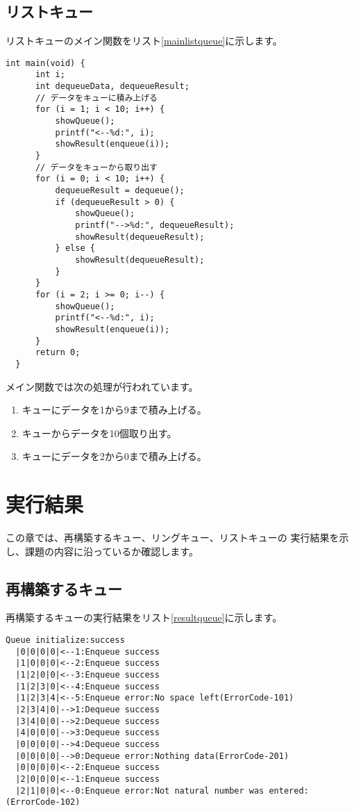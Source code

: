 \documentclass[a4j]{jarticle}
\begin{document}
\subsection{リストキュー}
リストキューのメイン関数をリスト\ref{mainlistqueue}に示します。

\begin{lstlisting}[caption=リストキューのメイン関数,label=mainlistqueue]
  int main(void) {
      int i;
      int dequeueData, dequeueResult;
      // データをキューに積み上げる
      for (i = 1; i < 10; i++) {
          showQueue();
          printf("<--%d:", i);
          showResult(enqueue(i));
      }
      // データをキューから取り出す
      for (i = 0; i < 10; i++) {
          dequeueResult = dequeue();
          if (dequeueResult > 0) {
              showQueue();
              printf("-->%d:", dequeueResult);
              showResult(dequeueResult);
          } else {
              showResult(dequeueResult);
          }
      }
      for (i = 2; i >= 0; i--) {
          showQueue();
          printf("<--%d:", i);
          showResult(enqueue(i));
      }
      return 0;
  }
\end{lstlisting}

メイン関数では次の処理が行われています。
\begin{enumerate}
  \item キューにデータを1から9まで積み上げる。
  \item キューからデータを10個取り出す。
  \item キューにデータを2から0まで積み上げる。
\end{enumerate}

\section{実行結果}
この章では、再構築するキュー、リングキュー、リストキューの
実行結果を示し、課題の内容に沿っているか確認します。

\subsection{再構築するキュー}
再構築するキューの実行結果をリスト\ref{resultqueue}に示します。

\begin{lstlisting}[caption=再構築するキューの実行結果,label=resultqueue]
  Queue initialize:success
  |0|0|0|0|<--1:Enqueue success
  |1|0|0|0|<--2:Enqueue success
  |1|2|0|0|<--3:Enqueue success
  |1|2|3|0|<--4:Enqueue success
  |1|2|3|4|<--5:Enqueue error:No space left(ErrorCode-101)
  |2|3|4|0|-->1:Dequeue success
  |3|4|0|0|-->2:Dequeue success
  |4|0|0|0|-->3:Dequeue success
  |0|0|0|0|-->4:Dequeue success
  |0|0|0|0|-->0:Dequeue error:Nothing data(ErrorCode-201)
  |0|0|0|0|<--2:Enqueue success
  |2|0|0|0|<--1:Enqueue success
  |2|1|0|0|<--0:Enqueue error:Not natural number was entered:(ErrorCode-102)
\end{lstlisting}
\end{document}
